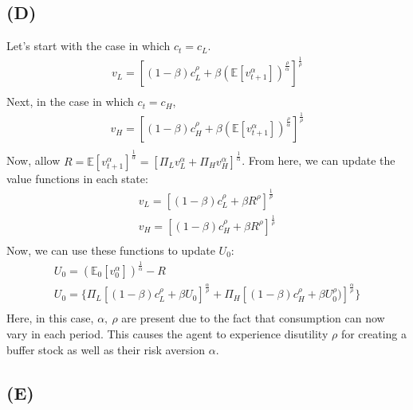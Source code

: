 \documentclass[10pt,a4paper]{article}
\begin{document}
  \subsection*{(D)}
    Let's start with the case in which $c_t = c_L$.
    \begin{gather*}
      v_L = [(1-\beta)c_L^{\rho} + \beta(\mathbb{E}[v_{t+1}^{\alpha}])^{\frac{\rho}{\alpha}}]^{\frac{1}{\rho}} \\
    \end{gather*}
    Next, in the case in which $c_t = c_H$,
    \begin{gather*}
      v_H = [(1-\beta)c_H^{\rho} + \beta(\mathbb{E}[v_{t+1}^{\alpha}])^{\frac{\rho}{\alpha}}]^{\frac{1}{\rho}} \\
    \end{gather*}
    Now, allow $R = \mathbb{E}[v_{t+1}^{\alpha}]^{\frac{1}{\alpha}} = [\Pi_Lv_L^{\alpha} + \Pi_Hv_H^{\alpha}]^{\frac{1}{\alpha}}$. From here, we can update the value functions in each state:
    \begin{gather*}
      v_L = [(1-\beta)c_L^{\rho} + \beta R^{\rho}]^{\frac{1}{\rho}} \\
      v_H = [(1-\beta)c_H^{\rho} + \beta R^{\rho}]^{\frac{1}{\rho}} \\
    \end{gather*}
    Now, we can use these functions to update $U_0$:
    \begin{gather*}
      U_0 = (\mathbb{E}_0[v_0^{\alpha}])^{\frac{1}{\alpha}} -R \\
      U_0 = \{\Pi_L[(1-\beta)c_L^{\rho} + \beta U_0]^{\frac{\alpha}{\rho}} + \Pi_H[(1-\beta)c_H^{\rho}+\beta U_0^{\rho})]^{\frac{\alpha}{\rho}}\} \\
    \end{gather*}
    Here, in this case, $\alpha, \ \rho$ are present due to the fact that consumption can now vary in each period. This causes the agent to experience disutility $\rho$ for creating a buffer stock as well as their risk aversion $\alpha$. 
  \subsection*{(E)}
    
\end{document}
